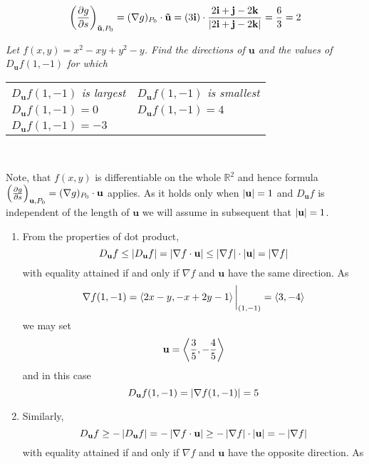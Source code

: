 \documentclass[8pt]{article} %
\begin{document}
\begin{description}
{		\[\left(\frac{\partial g}{\partial s}\right)_{\mathbf{\tilde{u}},P_0}=(\nabla g)_{P_0}\cdot\mathbf{\tilde{u}}=
		\left(3\mathbf{i}\right)\cdot\frac{{2\mathbf{i}+\mathbf{j}-2\mathbf{k}}}{\left|2\mathbf{i}+\mathbf{j}-2\mathbf{k}\right|}
		=\frac{6}{3}=2\]
		}
	\item[\# 29.]{{\it Let $f(x,y)=x^2-xy+y^2-y$. Find the directions of $\mathbf{u}$ and the values of $D_{\mathbf{u}}f(1,-1)$
		for which}
		\begin{inparaenum}[\bfseries a.]
			\setlength{\tabcolsep}{15pt}
			\begin{tabular}{ll}
		\item {\it $D_{\mathbf{u}}f(1,-1)$ is largest}
		&\item {\it $D_{\mathbf{u}}f(1,-1)$ is smallest}\\
		\item {\it $D_{\mathbf{u}}f(1,-1)=0$}
		&\item {\it $D_{\mathbf{u}}f(1,-1)=4$}\\
		\item {\it $D_{\mathbf{u}}f(1,-1)=-3$}\\
		\end{tabular}
		\end{inparaenum}\\
		}
		Note, that $f(x,y)$ is differentiable on the whole $\mathbb{R}^2$ and hence formula
		$\left(\frac{\partial g}{\partial s}\right)_{\mathbf{u},P_0}=(\nabla g)_{P_0}\cdot\mathbf{u}$ applies. As it holds only
		when $\left|\mathbf{u}\right|=1$ and 
		$D_{\mathbf{u}}f$ is independent of the length of $\mathbf{u}$ we will assume in subsequent that $\left|\mathbf{u}\right|
		=1$.
		\begin{enumerate}[\bfseries a.]
			\item From the properties of dot product,
				\[D_{\mathbf{u}}f\leq\left|D_{\mathbf{u}}f\right|=\left|\nabla f\cdot\mathbf{u}\right|\leq
				\left|\nabla f\right|\cdot\left|\mathbf{u}\right|=\left|\nabla f\right|\]
				with equality attained if and only if $\nabla f$ and $\mathbf{u}$ have the same direction. As
				\[\nabla f(1,-1)=\left<2x-y,-x+2y-1\right>\bigg|_{(1,-1)}=\left<3,-4\right>\]
				we may set \[\mathbf{u}=\left<\frac{3}{5},-\frac{4}{5}\right>\]
				and in this case
				\[D_{\mathbf{u}}f(1,-1)=\left|\nabla f(1,-1)\right|=5\]
			\item Similarly,
				\[D_{\mathbf{u}}f\geq-\left|D_{\mathbf{u}}f\right|=-\left|\nabla f\cdot\mathbf{u}\right|\geq-\left|\nabla f\right|
				\cdot\left|\mathbf{u}\right|=-\left|\nabla{f}\right|\]
				with equality attained if and only if $\nabla f$ and $\mathbf{u}$ have the opposite direction. As

\end{enumerate}
\end{description}
\end{document}
